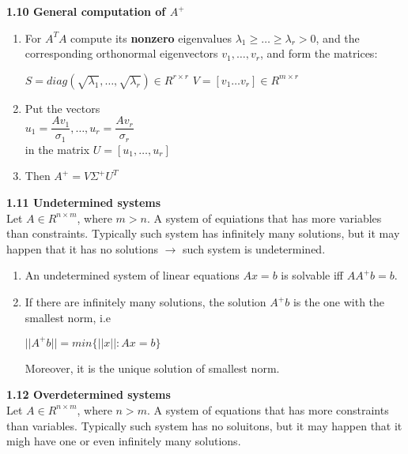 \documentclass{article}
\begin{document}
\begin{multicols}{2}
\textbf{1.10 General computation of $A^+$}
\begin{enumerate}
    \item For $A^TA$ compute its \textbf{nonzero} eigenvalues
        $\lambda_1 \geq \dots \geq \lambda_r > 0$, and the corresponding
        orthonormal eigenvectors $v_1, \dots, v_r$, and form the matrices:
        \begin{center}
            \begin{math}
                S = diag(\sqrt{\lambda_1}, \dots, \sqrt{\lambda_r}) \in R^{r \times r}
            \end{math}
            \begin{math}
                V = [v_1 \dots v_r] \in R^{m \times r}
            \end{math}
        \end{center}
    \item Put the vectors \\
         \begin{math}
             u_1 = \dfrac{Av_1}{\sigma_1}, \dots, u_r = \dfrac{Av_r}{\sigma_r}
        \end{math}\\ 
        in the matrix $U = [u_1, \dots, u_r]$
    \item Then $A^+ = V \Sigma^+ U^T$
\end{enumerate}

\textbf{1.11 Undetermined systems}\\
Let $A \in R^{n \times m}$, where $m > n$. A system of equiations that has more variables than
constraints. Typically such system has infinitely many solutions, but it may happen that it has no
solutions $\rightarrow$ such system is undetermined.
\begin{enumerate}
    \item An undetermined system of linear equations $Ax=b$ is solvable iff $AA^+b = b$.
    \item If there are infinitely many solutions, the solution $A^+b$ is the one with the
        smallest norm, i.e
        \begin{center}
            \begin{math}
                || A^+ b || = min\{||x||: Ax = b\}
            \end{math}
        \end{center}
        Moreover, it is the unique solution of smallest norm.
\end{enumerate}

\textbf{1.12 Overdetermined systems}\\
Let $A \in R^{n \times m}$, where $n > m$. A system of equations that has more constraints than
variables. Typically such system has no soluitons, but it may happen that it migh have one or
even infinitely many solutions.


\end{multicols}
\end{document}
